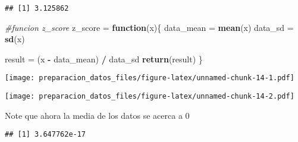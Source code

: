 \documentclass[]{article}
\newenvironment{Shaded}{\begin{snugshade}}{\end{snugshade}}
\newcommand{\CommentTok}[1]{\textcolor[rgb]{0.56,0.35,0.01}{\textit{#1}}}
\newcommand{\ControlFlowTok}[1]{\textcolor[rgb]{0.13,0.29,0.53}{\textbf{#1}}}
\newcommand{\DataTypeTok}[1]{\textcolor[rgb]{0.13,0.29,0.53}{#1}}
\newcommand{\KeywordTok}[1]{\textcolor[rgb]{0.13,0.29,0.53}{\textbf{#1}}}
\newcommand{\NormalTok}[1]{#1}
\newcommand{\OperatorTok}[1]{\textcolor[rgb]{0.81,0.36,0.00}{\textbf{#1}}}
\newcommand{\StringTok}[1]{\textcolor[rgb]{0.31,0.60,0.02}{#1}}
\begin{document}
\begin{verbatim}
## [1] 3.125862
\end{verbatim}

\begin{Shaded}
\begin{Highlighting}[]
\CommentTok{#funcion z_score}
\NormalTok{z_score =}\StringTok{ }\ControlFlowTok{function}\NormalTok{(x)\{}
\NormalTok{  data_mean =}\StringTok{ }\KeywordTok{mean}\NormalTok{(x)}
\NormalTok{  data_sd =}\StringTok{ }\KeywordTok{sd}\NormalTok{(x)}
  
\NormalTok{  result =}\StringTok{ }\NormalTok{(x }\OperatorTok{-}\StringTok{ }\NormalTok{data_mean) }\OperatorTok{/}\StringTok{ }\NormalTok{data_sd}
  \KeywordTok{return}\NormalTok{(result)}
\NormalTok{\}}
\end{Highlighting}
\end{Shaded}

\begin{Shaded}
\end{Shaded}

\texttt{[image: preparacion\_datos\_files/figure-latex/unnamed-chunk-14-1.pdf]}

\begin{Shaded}
\end{Shaded}

\texttt{[image: preparacion\_datos\_files/figure-latex/unnamed-chunk-14-2.pdf]}

Note que ahora la media de los datos se acerca a 0

\begin{Shaded}
\end{Shaded}

\begin{verbatim}
## [1] 3.647762e-17
\end{verbatim}
\end{document}
